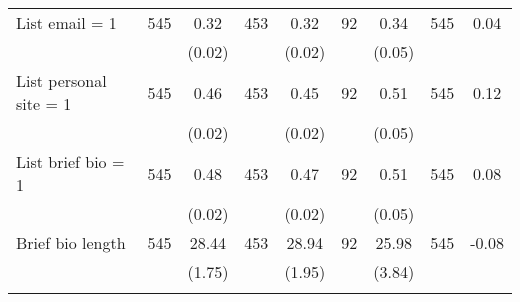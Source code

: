 \begin{tabular}{@{\extracolsep{5pt}}lcccccccc}
List email = 1   & 545    & 0.32    & 453    & 0.32    & 92    & 0.34    & 545    & 0.04   \\
 &   & (0.02)  &   & (0.02)  &   & (0.05)  &   &  \\ [1ex]
List personal site = 1   & 545    & 0.46    & 453    & 0.45    & 92    & 0.51    & 545    & 0.12   \\
 &   & (0.02)  &   & (0.02)  &   & (0.05)  &   &  \\ [1ex]
List brief bio = 1   & 545    & 0.48    & 453    & 0.47    & 92    & 0.51    & 545    & 0.08   \\
 &   & (0.02)  &   & (0.02)  &   & (0.05)  &   &  \\ [1ex]
Brief bio length   & 545    & 28.44    & 453    & 28.94    & 92    & 25.98    & 545    & -0.08   \\
 &   & (1.75)  &   & (1.95)  &   & (3.84)  &   &  \\ [1ex]
\hline \hline \\[-1.8ex]

\end{tabular}
